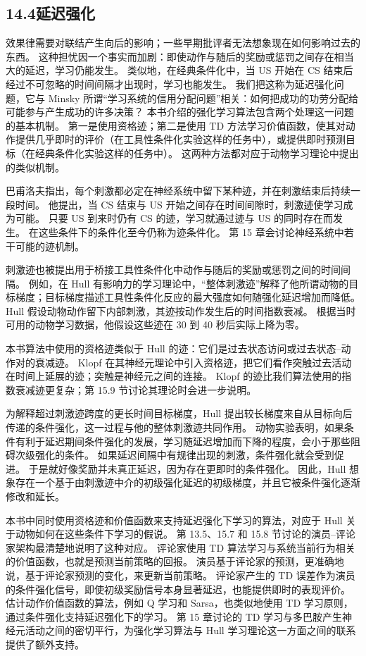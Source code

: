 \documentclass[UTF8,12pt,a4paper,fontset=fandol]{ctexart}
\begin{document}
\subsection*{14.4\quad 延迟强化}

效果律需要对联结产生向后的影响；一些早期批评者无法想象现在如何影响过去的东西。
这种担忧因一个事实而加剧：即使动作与随后的奖励或惩罚之间存在相当大的延迟，学习仍能发生。
类似地，在经典条件化中，当 US 开始在 CS 结束后经过不可忽略的时间间隔才出现时，学习也能发生。
我们把这称为延迟强化问题，它与 Minsky 所谓“学习系统的信用分配问题”相关：如何把成功的功劳分配给可能参与产生成功的许多决策？
本书介绍的强化学习算法包含两个处理这一问题的基本机制。
第一是使用资格迹；第二是使用 TD 方法学习价值函数，使其对动作提供几乎即时的评价（在工具性条件化实验这样的任务中），或提供即时预测目标（在经典条件化实验这样的任务中）。
这两种方法都对应于动物学习理论中提出的类似机制。

巴甫洛夫指出，每个刺激都必定在神经系统中留下某种迹，并在刺激结束后持续一段时间。
他提出，当 CS 结束与 US 开始之间存在时间间隙时，刺激迹使学习成为可能。
只要 US 到来时仍有 CS 的迹，学习就通过迹与 US 的同时存在而发生。
在这些条件下的条件化至今仍称为迹条件化。
第 15 章会讨论神经系统中若干可能的迹机制。

刺激迹也被提出用于桥接工具性条件化中动作与随后的奖励或惩罚之间的时间间隔。
例如，在 Hull 有影响力的学习理论中，“整体刺激迹”解释了他所谓动物的目标梯度；目标梯度描述工具性条件化反应的最大强度如何随强化延迟增加而降低。
Hull 假设动物动作留下内部刺激，其迹按动作发生后的时间指数衰减。
根据当时可用的动物学习数据，他假设这些迹在 30 到 40 秒后实际上降为零。

本书算法中使用的资格迹类似于 Hull 的迹：它们是过去状态访问或过去状态--动作对的衰减迹。
Klopf 在其神经元理论中引入资格迹，把它们看作突触过去活动在时间上延展的迹；突触是神经元之间的连接。
Klopf 的迹比我们算法使用的指数衰减迹更复杂；第 15.9 节讨论其理论时会进一步说明。

为解释超过刺激迹跨度的更长时间目标梯度，Hull 提出较长梯度来自从目标向后传递的条件强化，这一过程与他的整体刺激迹共同作用。
动物实验表明，如果条件有利于延迟期间条件强化的发展，学习随延迟增加而下降的程度，会小于那些阻碍次级强化的条件。
如果延迟间隔中有规律出现的刺激，条件强化就会受到促进。
于是就好像奖励并未真正延迟，因为存在更即时的条件强化。
因此，Hull 想象存在一个基于由刺激迹中介的初级强化延迟的初级梯度，并且它被条件强化逐渐修改和延长。

本书中同时使用资格迹和价值函数来支持延迟强化下学习的算法，对应于 Hull 关于动物如何在这些条件下学习的假说。
第 13.5、15.7 和 15.8 节讨论的演员--评论家架构最清楚地说明了这种对应。
评论家使用 TD 算法学习与系统当前行为相关的价值函数，也就是预测当前策略的回报。
演员基于评论家的预测，更准确地说，基于评论家预测的变化，来更新当前策略。
评论家产生的 TD 误差作为演员的条件强化信号，即使初级奖励信号本身显著延迟，也能提供即时的表现评价。
估计动作价值函数的算法，例如 Q 学习和 Sarsa，也类似地使用 TD 学习原则，通过条件强化支持延迟强化下的学习。
第 15 章讨论的 TD 学习与多巴胺产生神经元活动之间的密切平行，为强化学习算法与 Hull 学习理论这一方面之间的联系提供了额外支持。
\end{document}
